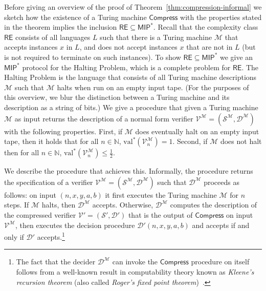 \documentclass[11pt]{article}
\theoremstyle{definition}
\newcommand{\N}{\ensuremath{\mathbb{N}}}
\newcommand{\val}{\ensuremath{\mathrm{val}}}
\newcommand{\sampler}{\mathcal{S}}
\newcommand{\decider}{\mathcal{D}}
\newcommand{\verifier}{\mathcal{V}}
\newcommand{\class}[1]{\ensuremath{\mathsf{#1}}\xspace}
\newcommand{\MIP}{\class{MIP}} %
\newcommand{\RE}{\class{RE}} %
\newcommand{\machine}{\cal{M}}
\renewcommand{\cal}[1]{\mathcal{#1}}
\newcommand{\tmstyle}[1]{\ensuremath{\mathsf{#1}}}
\newcommand{\Compress}{\tmstyle{Compress}}
\begin{document}
Before giving an overview of the proof of Theorem~\ref{thm:compression-informal} we sketch how the existence of a Turing machine $\Compress$ with the properties stated in the theorem implies the inclusion $\RE\subseteq \MIP^*$. Recall that the complexity class $\RE$ consists of all languages $L$ such that there is a Turing machine $\cal{M}$ that accepts instances $x$ in $L$, and does not accept instances $x$ that are not in $L$ (but is not required to terminate on such instances). %
To show $\RE \subseteq \MIP^*$ we give an $\MIP^*$ protocol for the Halting Problem, which is a complete problem for $\RE$. The Halting Problem is the language that consists of all Turing machine descriptions $\cal{M}$ such that $\cal{M}$ halts when run on an empty input tape. (For the purposes of this overview, we blur the distinction between a Turing machine and its description as a string of bits.) We give a procedure that given a Turing machine $\cal{M}$ as input returns the description of a normal form verifier $\verifier^{\cal{M}} = (\sampler^\machine,\decider^\machine)$ with the following properties. First, if $\cal{M}$ does eventually halt on an empty input tape, then it holds that for all $n \in \N$, $\val^*(\verifier^{\cal{M}}_n) = 1$. Second, if $\cal{M}$ does not halt then for all $n \in \N$, $\val^*(\verifier^{\cal{M}}_n) \leq \frac{1}{2}$. 

We describe the procedure that achieves this. Informally, the procedure returns the specification of a verifier $\verifier^{\cal{M}} = (\sampler^\machine,\decider^\machine)$ such that $\decider^\machine$ proceeds as follows: on input $(n,x,y,a,b)$ it first executes the Turing machine $\cal{M}$ for $n$ steps. If $\cal{M}$ halts, then $\decider^\machine$ accepts. Otherwise, $\decider^\machine$ computes the description of the compressed verifier $\verifier' = (\sampler',\decider')$ that is the output of $\Compress$ on input $\verifier^\machine$, then executes the decision procedure $\decider'(n,x,y,a,b)$ and accepts if and only if $\decider'$ accepts.\footnote{The fact that the decider $\decider^\machine$ can invoke the $\Compress$ procedure on itself follows from a well-known result in computability theory known as \emph{Kleene's recursion theorem} (also called \emph{Roger's fixed point theorem})~\cite{Kleene1954,Rogers1987}.} 
\end{document}

